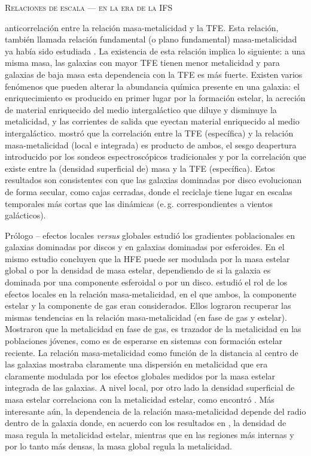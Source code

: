 \documentclass[xcolor=dvipsnames,4pt,hyperref={colorlinks,citecolor=black,linkcolor=black,urlcolor=black}]{beamer}
\begin{document}
\begin{frame}[allowframebreaks]{\textsc{Relaciones de escala --- en la era de la IFS}}
\begin{description}
anticorrelación entre la relación masa-metalicidad y la TFE. Esta relación, también llamada relación
fundamental (o plano fundamental) masa-metalicidad ya había sido estudiada \citep{Lara-Lopez2010}.
La existencia de esta relación implica lo siguiente: a una misma masa, las galaxias con mayor TFE
tienen menor metalicidad y para galaxias de baja masa esta dependencia con la TFE es más fuerte.
Existen varios fenómenos que pueden alterar la abundancia química presente en una galaxia: el
enriquecimiento es producido en primer lugar por la formación estelar, la acreción de material
enriquecido del medio intergaláctico que diluye y disminuye la metalicidad, y las corrientes de
salida que eyectan material enriquecido al medio intergaláctico. \citet{Sanchez2013} mostró que la
correlación entre la TFE (específica) y la relación masa-metalicidad (local e integrada) es producto
de ambos, el sesgo deapertura introducido por los sondeos espectroscópicos tradicionales y por la
correlación que existe entre la (densidad superficial de) masa y la TFE (específica). Estos
resultados son consistentes con que las galaxias dominadas por disco evolucionan de forma secular,
como cajas cerradas, donde el reciclaje tiene lugar en escalas temporales más cortas que las
dinámicas (e.\,g. correspondientes a vientos galácticos).
%
\end{description}

\end{frame}

\begin{frame}[allowframebreaks]{Prólogo -- efectos locales \emph{versus} globales}
%
\citet{Gonzalez2014a} estudió los gradientes poblacionales en galaxias dominadas por discos y en
galaxias dominadas por esferoides. En el mismo estudio concluyen que la HFE puede ser modulada por
la masa estelar global o por la densidad de masa estelar, dependiendo de si la galaxia es dominada
por una componente esferoidal o por un disco. \citet{Gonzalez2014b} estudió el rol de los efectos
locales en la relación masa-metalicidad, en el que ambos, la componente estelar y la componente de
gas eran considerados. Ellos lograron recuperar las mismas tendencias en la relación
masa-metalicidad (en fase de gas y estelar). Mostraron que la metalicidad en fase de gas, es
trazador de la metalicidad en las poblaciones jóvenes, como es de esperarse en sistemas con
formación estelar reciente. La relación masa-metalicidad como función de la distancia al centro de
las galaxias mostraba claramente una dispersión en metalicidad que era claramente modulada por los
efectos globales medidos por la masa estelar integrada de las galaxias. A nivel local, por otro lado
la densidad superficial de masa estelar correlaciona con la metalicidad estelar, como encontró
\citet{Sanchez2013}. Más interesante aún, la dependencia de la relación masa-metalicidad depende del
radio dentro de la galaxia donde, en acuerdo con los resultados en \citet{Gonzalez2014a}, la
densidad de masa regula la metalicidad estelar, mientras que en las regiones más internas y por lo
tanto más densas, la masa global regula la metalicidad.
%
\end{frame}
\end{document}
